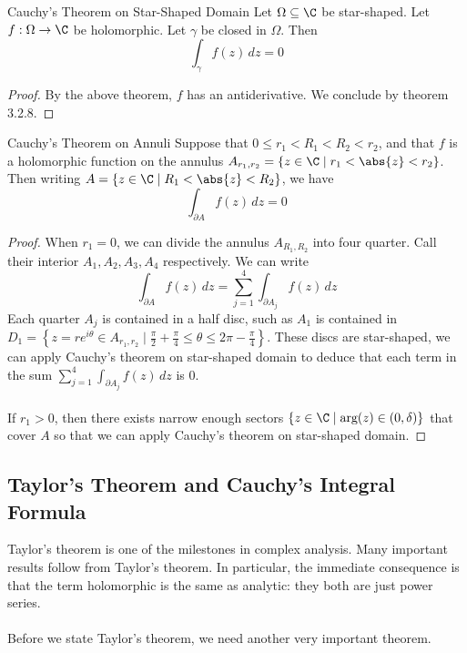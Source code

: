 \documentclass[a4paper]{article}
\begin{document}
\begin{thm}{Cauchy's Theorem on Star-Shaped Domain}{} Let $\Omega\subseteq\C$ be star-shaped. Let $f:\Omega\to\C$ be holomorphic. Let $\gamma$ be closed in $\Omega$. Then $$\int_{\gamma}f(z)\,dz=0$$ \tcbline
\begin{proof}
By the above theorem, $f$ has an antiderivative. We conclude by theorem 3.2.8. 
\end{proof}
\end{thm}

\begin{crl}{Cauchy's Theorem on Annuli}{} Suppose that $0\leq r_1<R_1<R_2<r_2$, and that $f$ is a holomorphic function on the annulus $A_{r_1,r_2}=\{z\in\C\;|\; r_1<\abs{z}<r_2\}$. Then writing $A=\{z\in\C\;|\; R_1<\abs{z}<R_2\}$, we have $$\int_{\partial A}f(z)\,dz=0$$ \tcbline
\begin{proof}
When $r_1=0$, we can divide the annulus $A_{R_1,R_2}$ into four quarter. Call their interior $A_1,A_2,A_3,A_4$ respectively. We can write $$\int_{\partial A}f(z)\,dz=\sum_{j=1}^4\int_{\partial A_j}f(z)\,dz$$ Each quarter $A_j$ is contained in a half disc, such as $A_1$ is contained in $D_1=\left\{z=re^{i\theta}\in A_{r_1,r_2}\;|\; \frac{\pi}{2}+\frac{\pi}{4}\leq\theta\leq 2\pi-\frac{\pi}{4}\right\}$. These discs are star-shaped, we can apply Cauchy's theorem on star-shaped domain to deduce that each term in the sum $\sum_{j=1}^4\int_{\partial A_j}f(z)\,dz$ is $0$. \\~\\

If $r_1>0$, then there exists narrow enough sectors $\{z\in\C\;|\;\text{arg}(z)\in(0,\delta)\}$ that cover $A$ so that we can apply Cauchy's theorem on star-shaped domain. 
\end{proof}
\end{crl}

\subsection{Taylor's Theorem and Cauchy's Integral Formula}
Taylor's theorem is one of the milestones in complex analysis. Many important results follow from Taylor's theorem. In particular, the immediate consequence is that the term holomorphic is the same as analytic: they both are just power series. \\~\\

Before we state Taylor's theorem, we need another very important theorem. 
\end{document}
